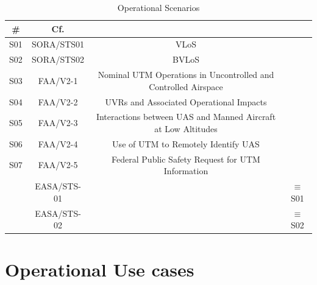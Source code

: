 \documentclass{ua_wgs_base}
\begin{document}
\begin{table}[tbh]
\begin{centering}
\begin{tabular}{|c|c|c|c|}
\hline 
\textbf{\#} & \textbf{Cf.} &  & \tabularnewline
\hline 
\hline 
S01 & SORA/STS01 & VLoS & \tabularnewline
\hline 
S02 & SORA/STS02 & BVLoS & \tabularnewline
\hline 
S03 & FAA/V2-1 & Nominal UTM Operations in Uncontrolled and Controlled Airspace & \tabularnewline
\hline 
S04 & FAA/V2-2 & UVRs and Associated Operational Impacts & \tabularnewline
\hline 
S05 & FAA/V2-3 & Interactions between UAS and Manned Aircraft at Low Altitudes & \tabularnewline
\hline 
S06 & FAA/V2-4 & Use of UTM to Remotely Identify UAS & \tabularnewline
\hline 
S07 & FAA/V2-5 & Federal Public Safety Request for UTM Information & \tabularnewline
\hline 
 & EASA/STS-01 &  & $\equiv$S01\tabularnewline
\hline 
 & EASA/STS-02 &  & $\equiv$S02\tabularnewline
\hline 
\end{tabular}
\par\end{centering}
\caption{Operational Scenarios}

\end{table}


\section{Operational Use cases\label{sec:OpUseCases}}
\end{document}
